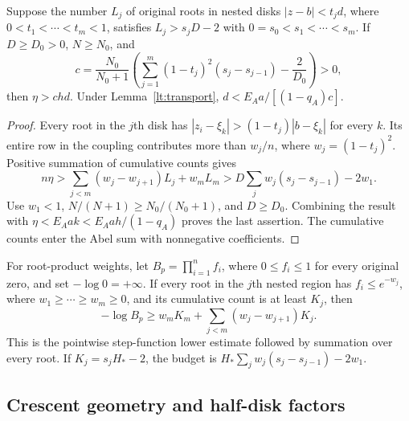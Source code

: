 \begin{lemma}\label{lt:abel}
Suppose the number $L_j$ of original roots in nested disks
$|z-b|<t_jd$, where $0<t_1<\cdots<t_m<1$, satisfies
$L_j>s_jD-2$ with $0=s_0<s_1<\cdots<s_m$.
If $D\ge D_0>0$, $N\ge N_0$, and
\[
 c=\frac{N_0}{N_0+1}
 \left(\sum_{j=1}^m(1-t_j)^2(s_j-s_{j-1})-\frac2{D_0}\right)>0,
\]
then $\eta>chd$. Under Lemma~\ref{lt:transport},
$d<E_Aa/[(1-q_A)c]$.
\end{lemma}
\begin{proof}
Every root in the $j$th disk has
$|z_i-\xi_k|>(1-t_j)|b-\xi_k|$ for every $k$.
Its entire row in the coupling contributes more than
$w_j/n$, where $w_j=(1-t_j)^2$. Positive summation of cumulative
counts gives
\[
 n\eta>\sum_{j<m}(w_j-w_{j+1})L_j+w_mL_m
 >D\sum_jw_j(s_j-s_{j-1})-2w_1.
\]
Use $w_1<1$, $N/(N+1)\ge N_0/(N_0+1)$, and $D\ge D_0$.
Combining the result with $\eta<E_Aak<E_Aah/(1-q_A)$ proves
the last assertion. The cumulative counts enter the Abel sum with
nonnegative coefficients.
\end{proof}

For root-product weights, let $B_p=\prod_{i=1}^n f_i$, where
$0\le f_i\le1$ for every original zero, and set $-\log0=+\infty$.
If every root in the $j$th nested region has $f_i\le e^{-w_j}$,
where $w_1\ge\cdots\ge w_m\ge0$, and its cumulative count is
at least $K_j$, then
\begin{equation}\label{lt:abel-product}
 -\log B_p\ge w_mK_m+\sum_{j<m}(w_j-w_{j+1})K_j.
\end{equation}
This is the pointwise step-function lower estimate followed by
summation over every root. If $K_j=s_jH_*-2$, the budget is
$H_*\sum_jw_j(s_j-s_{j-1})-2w_1$.

\subsection{Crescent geometry and half-disk factors}

